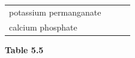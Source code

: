 \begin{enumerate}[noitemsep, label=\textbf{\arabic*}. ]
{{\begin{center}
\begin{tabular}[t]{|l|l|l|l|}
    
        potassium permanganate &
    
    
         &
    
    
         &
    
    
     \tabularnewline\cline{1-1}\cline{2-2}\cline{3-3}\cline{4-4}
    
    
        calcium phosphate &
    
    
         &
    
    
         &
    
    
     \tabularnewline\cline{1-1}\cline{2-2}\cline{3-3}\cline{4-4}
    \end{tabular}
      \end{center}
    \begin{center}{\small\bfseries Table 5.5}\end{center}
    
}}
\end{enumerate}

